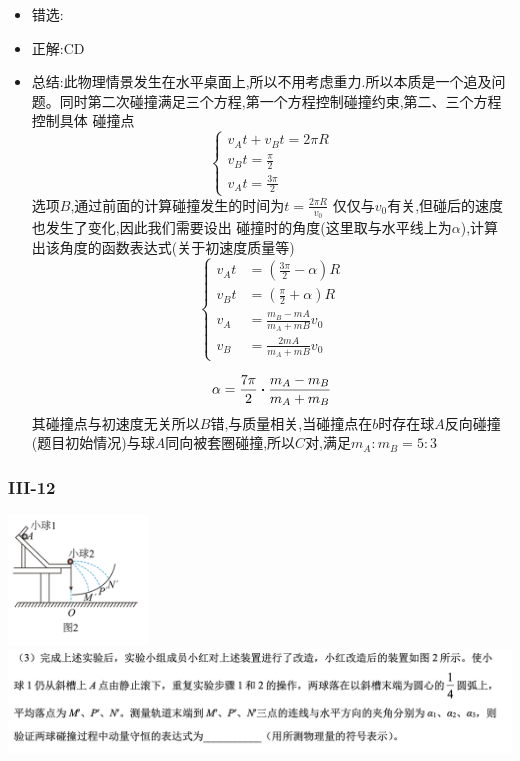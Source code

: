 \documentclass{article}
\begin{document}
    \begin{itemize}
        \item 错选:\quad
        \item 正解:\quad CD
        \item 总结:\quad 此物理情景发生在水平桌面上,所以不用考虑重力.所以本质是一个追及问题。同时第二次碰撞满足三个方程,第一个方程控制碰撞约束,第二、三个方程控制具体
                  碰撞点
                  $$
                  \begin{cases}
                    v_{A} t + v_{B} t = 2 \pi R     \\
                    v_{B} t  = \frac{\pi}{2}        \\
                    v_{A} t = \frac{3\pi}{2}
                  \end{cases}
                  $$
                  选项$B$,通过前面的计算碰撞发生的时间为$t = \frac{2\pi R}{v_{0}}$ 仅仅与$v_{0}$有关,但碰后的速度也发生了变化,因此我们需要设出
                  碰撞时的角度(这里取与水平线上为$\alpha$),计算出该角度的函数表达式(关于初速度质量等)
                  $$
                  \begin{cases}
                    v_{A} t &= (\frac{3\pi}{2} - \alpha) R \\
                    v_{B} t &= (\frac{\pi}{2} + \alpha) R  \\
                    v_{A} &= \frac{m_{B} - m{A}}{m_{A}+m{B}} v_{0}   \\
                    v_{B} &= \frac{2 m{A}}{m_{A}+m{B}} v_{0} 
                  \end{cases}   
                  $$

                  $$
                  \alpha = \frac{7 \pi}{2} \vdot \frac{m_{A} - m_{B}}{m_{A} + m_{B}} 
                  $$
                  其碰撞点与初速度无关所以$B$错,与质量相关,当碰撞点在$b$时存在球$A$反向碰撞(题目初始情况)与球$A$同向被套圈碰撞,所以$C$对,满足$m_{A} : m_{B} = 5 : 3$
    \end{itemize}

    \subsubsection{III-12}
    \includegraphics[width=10em,keepaspectratio]{./pictures/1.2-4.png}
    \includegraphics[width=40em,keepaspectratio]{./pictures/1.2-5.png}
\end{document}
